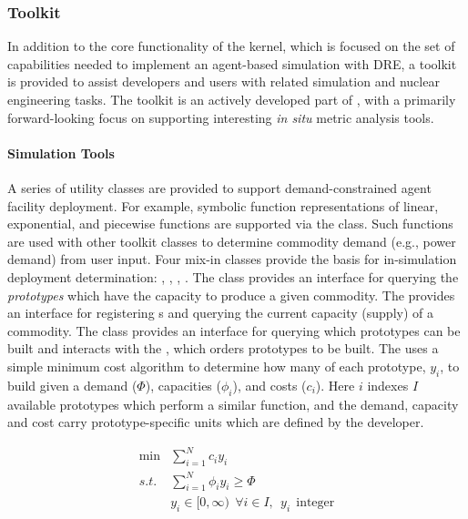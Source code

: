\subsubsection{Toolkit}

In addition to the core functionality of the \Cyclus kernel, which is focused on
the set of capabilities needed to implement an agent-based simulation
with \gls{DRE}, a toolkit is provided to assist developers
and users with related simulation and nuclear engineering tasks. The toolkit is
an actively developed part of \Cyclus, with a primarily forward-looking
focus on supporting interesting \textit{in situ} metric analysis tools.

\paragraph{Simulation Tools}

A series of utility classes are provided to support demand-constrained agent
facility deployment. For example, symbolic function representations of linear,
exponential, and piecewise functions are supported via the
 class. Such functions are used with other toolkit
classes to determine commodity demand (e.g., power demand) from user input. Four
mix-in classes provide the basis for in-simulation deployment determination:
, , ,
. The  class provides an
interface for querying the \textit{prototypes} which have the
capacity to produce a given commodity. The 
provides an interface for registering s and querying
the current capacity (supply) of a commodity. The  class provides
an interface for querying which prototypes can be built and interacts with the
, which orders prototypes to be built. The
 uses a simple minimum cost algorithm to determine how
many of each prototype, $y_i$, to build given a demand ($\Phi$), capacities
($\phi_i$), and costs ($c_i$). Here $i$ indexes $I$ available prototypes which perform a similar function, and the demand, capacity and cost carry prototype-specific units which are defined by the developer.

\begin{equation}
\begin{aligned}
 \min & \sum_{i=1}^{N}c_i y_i \\
 s.t. & \sum_{i=1}^{N}\phi_i y_i \ge \Phi \\
      & y_i \in [0,\infty) \:\: \forall i \in I, \:\: y_i \:\: \text{integer}
\end{aligned}
\end{equation}

